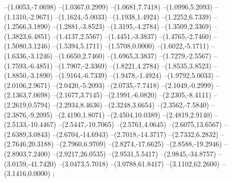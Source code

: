 {--(1.0053,-7.0698)
--(1.0367,0.2999)
--(1.0681,7.7418)
--(1.0996,5.2093)
--(1.1310,-2.9671)
--(1.1624,-5.0033)
--(1.1938,1.4924)
--(1.2252,6.7339)
--(1.2566,3.1890)
--(1.2881,-3.8523)
--(1.3195,-4.2784)
--(1.3509,2.3369)
--(1.3823,6.4851)
--(1.4137,2.5567)
--(1.4451,-3.3837)
--(1.4765,-2.7460)
--(1.5080,3.1246)
--(1.5394,5.1711)
--(1.5708,0.0000)
--(1.6022,-5.1711)
--(1.6336,-3.1246)
--(1.6650,2.7460)
--(1.6965,3.3837)
--(1.7279,-2.5567)
--(1.7593,-6.4851)
--(1.7907,-2.3369)
--(1.8221,4.2784)
--(1.8535,3.8523)
--(1.8850,-3.1890)
--(1.9164,-6.7339)
--(1.9478,-1.4924)
--(1.9792,5.0033)
--(2.0106,2.9671)
--(2.0420,-5.2093)
--(2.0735,-7.7418)
--(2.1049,-0.2999)
--(2.1363,7.0698)
--(2.1677,3.7145)
--(2.1991,-6.0820)
--(2.2305,-8.4111)
--(2.2619,0.5794)
--(2.2934,8.4636)
--(2.3248,3.6654)
--(2.3562,-7.5840)
--(2.3876,-9.2095)
--(2.4190,1.8071)
--(2.4504,10.0389)
--(2.4819,2.9140)
--(2.5133,-10.4467)
--(2.5447,-10.7065)
--(2.5761,4.0645)
--(2.6075,13.6567)
--(2.6389,3.0843)
--(2.6704,-14.6943)
--(2.7018,-14.3717)
--(2.7332,6.2832)
--(2.7646,20.3188)
--(2.7960,6.9709)
--(2.8274,-17.6625)
--(2.8588,-19.2946)
--(2.8903,7.2400)
--(2.9217,26.0535)
--(2.9531,5.5417)
--(2.9845,-34.8757)
--(3.0159,-41.7420)
--(3.0473,5.7018)
--(3.0788,61.8417)
--(3.1102,62.2600)
--(3.1416,0.0000)
;}
